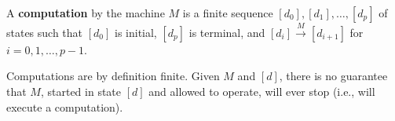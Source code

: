 A \textbf{computation} by the machine $M$ is a finite sequence $[d_0], [d_1], \ldots, [d_p]$ of states such that $[d_0]$ is initial, $[d_p]$ is terminal, and $[d_i] \xrightarrow{M} [d_{i+1}]$ for $i = 0, 1, \ldots, p - 1$.

Computations are by definition finite. Given $M$ and $[d]$, there is no guarantee that $M$, started in state $[d]$ and allowed to operate, will ever stop (i.e., will execute a computation).
